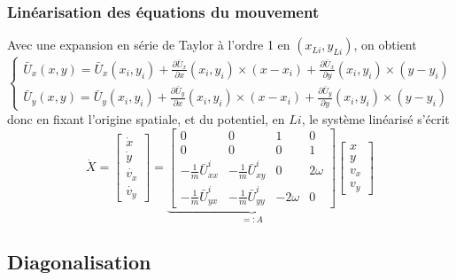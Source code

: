 \documentclass{beamer}
\begin{document}
	\begin{frame}
		\frametitle{Linéarisation des équations du mouvement}{\small
		Avec une expansion en série de Taylor à l'ordre 1 en $(x_{Li}, y_{Li})$, on obtient
		\begin{equation*}
			\begin{cases}
				\bar{U}_x(x,y) = \bar{U}_x(x_i,y_i) + \frac{\partial \bar{U}_x}{\partial x} (x_i,y_i) \times (x - x_i) + \frac{\partial \bar{U}_x}{\partial y} (x_i,y_i) \times (y - y_i)
				\\
				\bar{U}_y(x,y) = \bar{U}_y(x_i,y_i) + \frac{\partial \bar{U}_y}{\partial x} (x_i,y_i) \times (x - x_i) + \frac{\partial \bar{U}_y}{\partial y} (x_i,y_i) \times (y - y_i)
			\end{cases}
		\end{equation*}
		donc en fixant l'origine spatiale, et du potentiel, en $Li$, le système linéarisé s'écrit
		\begin{equation*}
			\label{eq du mvt}
			\dot{X}
			=
			\begin{bmatrix}
				\dot{x} \\
				\dot{y} \\
				\dot{v_x} \\
				\dot{v_y}
			\end{bmatrix}
			=
			\underbrace{
				\begin{bmatrix}
					0 & 0 & 1 & 0 \\
					0 & 0 & 0 & 1 \\
					-\frac{1}{m}\bar{U}_{xx}^i & -\frac{1}{m}\bar{U}_{xy}^i
					& 0 & 2\omega \\
					-\frac{1}{m}\bar{U}_{yx}^i & -\frac{1}{m}\bar{U}_{yy}^i
					& -2\omega & 0
				\end{bmatrix}
			}_{=: A}
			\begin{bmatrix}
				x \\ y \\ v_x \\ v_y
			\end{bmatrix}
		\end{equation*}
		}
	\end{frame}
	
	
	\subsection{Diagonalisation}
	
\end{document}
